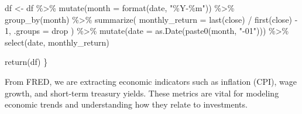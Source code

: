 \documentclass[
  letterpaper,
  DIV=11,
  numbers=noendperiod]{scrartcl}
\newenvironment{Shaded}{\begin{snugshade}}{\end{snugshade}}
\newcommand{\AttributeTok}[1]{\textcolor[rgb]{0.40,0.45,0.13}{#1}}
\newcommand{\DecValTok}[1]{\textcolor[rgb]{0.68,0.00,0.00}{#1}}
\newcommand{\FunctionTok}[1]{\textcolor[rgb]{0.28,0.35,0.67}{#1}}
\newcommand{\NormalTok}[1]{\textcolor[rgb]{0.00,0.23,0.31}{#1}}
\newcommand{\OtherTok}[1]{\textcolor[rgb]{0.00,0.23,0.31}{#1}}
\newcommand{\SpecialCharTok}[1]{\textcolor[rgb]{0.37,0.37,0.37}{#1}}
\newcommand{\StringTok}[1]{\textcolor[rgb]{0.13,0.47,0.30}{#1}}
\begin{document}
\begin{Shaded}
\begin{Highlighting}[]
\NormalTok{  df }\OtherTok{\textless{}{-}}\NormalTok{ df }\SpecialCharTok{\%\textgreater{}\%}
    \FunctionTok{mutate}\NormalTok{(}\AttributeTok{month =} \FunctionTok{format}\NormalTok{(date, }\StringTok{"\%Y{-}\%m"}\NormalTok{)) }\SpecialCharTok{\%\textgreater{}\%}
    \FunctionTok{group\_by}\NormalTok{(month) }\SpecialCharTok{\%\textgreater{}\%}
    \FunctionTok{summarize}\NormalTok{(}
      \AttributeTok{monthly\_return =} \FunctionTok{last}\NormalTok{(close) }\SpecialCharTok{/} \FunctionTok{first}\NormalTok{(close) }\SpecialCharTok{{-}} \DecValTok{1}\NormalTok{,}
      \AttributeTok{.groups =} \StringTok{\textquotesingle{}drop\textquotesingle{}}
\NormalTok{    ) }\SpecialCharTok{\%\textgreater{}\%}
    \FunctionTok{mutate}\NormalTok{(}\AttributeTok{date =} \FunctionTok{as.Date}\NormalTok{(}\FunctionTok{paste0}\NormalTok{(month, }\StringTok{"{-}01"}\NormalTok{))) }\SpecialCharTok{\%\textgreater{}\%}
    \FunctionTok{select}\NormalTok{(date, monthly\_return)}
  
  \FunctionTok{return}\NormalTok{(df)}
\NormalTok{\}}
\end{Highlighting}
\end{Shaded}

From FRED, we are extracting economic indicators such as inflation
(CPI), wage growth, and short-term treasury yields. These metrics are
vital for modeling economic trends and understanding how they relate to
investments.
\end{document}
